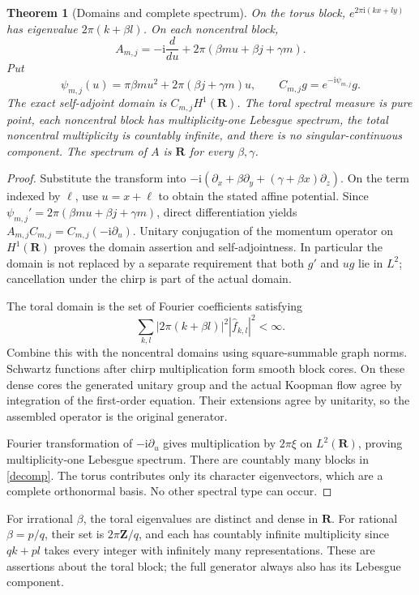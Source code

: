 \documentclass[10pt]{article}
\newtheorem{theorem}{Theorem}
\newcommand{\R}{\mathbf R}
\newcommand{\Z}{\mathbf Z}
\newcommand{\ii}{\mathrm i}
\begin{document}
\begin{theorem}[Domains and complete spectrum]
On the torus block, $e^{2\pi\ii(kx+ly)}$ has eigenvalue $2\pi(k+\beta l)$.
On each noncentral block,
\[
 A_{m,j}=-\ii\frac{d}{du}+2\pi(\beta m u+\beta j+\gamma m).
\]
Put
\[
 \psi_{m,j}(u)=\pi\beta m u^2+2\pi(\beta j+\gamma m)u,\qquad
 C_{m,j}g=e^{-\ii\psi_{m,j}}g.
\]
The exact self-adjoint domain is $C_{m,j}H^1(\R)$.
The toral spectral measure is pure point, each noncentral block has
multiplicity-one Lebesgue spectrum, the total noncentral multiplicity is
countably infinite, and there is no singular-continuous component.
The spectrum of $A$ is $\R$ for every $\beta,\gamma$.
\end{theorem}
\begin{proof}
Substitute the transform into $-\ii(\partial_x+\beta\partial_y+
(\gamma+\beta x)\partial_z)$. On the term indexed by $\ell$, use
$u=x+\ell$ to obtain the stated affine potential. Since
$\psi_{m,j}'=2\pi(\beta m u+\beta j+\gamma m)$,
direct differentiation yields
$A_{m,j}C_{m,j}=C_{m,j}(-\ii\partial_u)$.
Unitary conjugation of the momentum operator on $H^1(\R)$ proves the
domain assertion and self-adjointness. In particular the domain is not
replaced by a separate requirement that both $g'$ and $ug$ lie in $L^2$;
cancellation under the chirp is part of the actual domain.

The toral domain is the set of Fourier coefficients satisfying
\[
 \sum_{k,l}|2\pi(k+\beta l)|^2|\widehat f_{k,l}|^2<\infty.
\]
Combine this with the noncentral domains using square-summable graph norms.
Schwartz functions after chirp multiplication form smooth block cores.
On these dense cores the generated unitary group and the actual Koopman
flow agree by integration of the first-order equation. Their extensions
agree by unitarity, so the assembled operator is the original generator.

Fourier transformation of $-\ii\partial_u$ gives multiplication by
$2\pi\xi$ on $L^2(\R)$, proving multiplicity-one Lebesgue spectrum.
There are countably many blocks in \eqref{decomp}. The torus contributes
only its character eigenvectors, which are a complete orthonormal basis.
No other spectral type can occur.
\end{proof}

For irrational $\beta$, the toral eigenvalues are distinct and dense in
$\R$. For rational $\beta=p/q$, their set is $2\pi\Z/q$, and each has
countably infinite multiplicity since $qk+pl$ takes every integer with
infinitely many representations. These are assertions about the toral
block; the full generator always also has its Lebesgue component.
\end{document}
